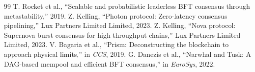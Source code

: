 \documentclass[11pt,a4paper]{article}
\begin{document}
\begin{thebibliography}{99}
 T. Rocket et al., ``Scalable and probabilistic leaderless BFT consensus through metastability,'' 2019.
 Z. Kelling, ``Photon protocol: Zero-latency consensus pipelining,'' Lux Partners Limited Limited, 2023.
 Z. Kelling, ``Nova protocol: Supernova burst consensus for high-throughput chains,'' Lux Partners Limited Limited, 2023.
 V. Bagaria et al., ``Prism: Deconstructing the blockchain to approach physical limits,'' in \emph{CCS}, 2019.
 G. Danezis et al., ``Narwhal and Tusk: A DAG-based mempool and efficient BFT consensus,'' in \emph{EuroSys}, 2022.
\end{thebibliography}
\end{document}

